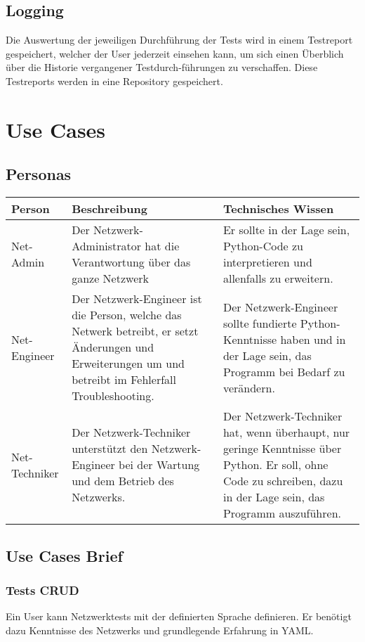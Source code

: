 \documentclass[
	ngerman,
	toc=listof, %
	toc=bibliography, %
	footnotes=multiple, %
	parskip=half, %
	numbers=noendperiod %
]{scrartcl}
\begin{document}
	\subsection{Logging}
	Die Auswertung der jeweiligen Durchführung der Tests wird in einem Testreport gespeichert, welcher der User jederzeit einsehen kann, 
	um sich einen Überblich über die Historie vergangener Testdurch-führungen zu verschaffen. Diese Testreports werden in eine Repository gespeichert.








\section{Use Cases}
	\subsection{Personas}
		\begin{tabularx}{\textwidth}{lXX}
			\toprule
			Person & Beschreibung & Technisches Wissen \\
			\midrule
			Net-Admin & Der Netzwerk-Administrator hat die Verantwortung über das ganze Netzwerk & Er sollte in der Lage sein, Python-Code zu interpretieren und allenfalls zu erweitern.\\
			\midrule
			Net-Engineer & Der Netzwerk-Engineer ist die Person, welche das Netwerk betreibt, er setzt Änderungen und Erweiterungen um und betreibt im Fehlerfall Troubleshooting. & Der Netzwerk-Engineer sollte fundierte Python-Kenntnisse haben und in der Lage sein, das Programm bei Bedarf zu verändern. \\
			\midrule
			Net-Techniker & Der Netzwerk-Techniker unterstützt den Netzwerk-Engineer bei der Wartung und dem Betrieb des Netzwerks. & Der Netzwerk-Techniker hat, wenn überhaupt, nur geringe Kenntnisse über Python. Er soll, ohne Code zu schreiben, dazu in der Lage sein, das Programm auszuführen. \\
			\bottomrule
		\end{tabularx}

	\subsection{Use Cases Brief}
		\subsubsection{Tests CRUD}
			Ein User kann Netzwerktests mit der definierten Sprache definieren. Er benötigt dazu Kenntnisse des Netzwerks und grundlegende Erfahrung in YAML.
\end{document}
